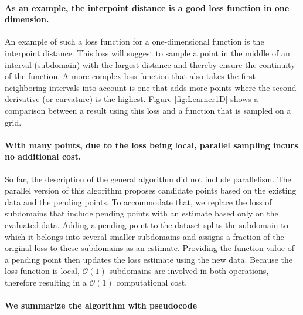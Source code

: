 \hypertarget{as-an-example-the-interpoint-distance-is-a-good-loss-function-in-one-dimension.}{%
\paragraph{As an example, the interpoint distance is a good loss function in one dimension.}\label{as-an-example-the-interpoint-distance-is-a-good-loss-function-in-one-dimension.}}

An example of such a loss function for a one-dimensional function is the interpoint distance.
This loss will suggest to sample a point in the middle of an interval (subdomain) with the largest distance and thereby ensure the continuity of the function.
A more complex loss function that also takes the first neighboring intervals into account is one that adds more points where the second derivative (or curvature) is the highest.
Figure \ref{fig:Learner1D} shows a comparison between a result using this loss and a function that is sampled on a grid.

\hypertarget{with-many-points-due-to-the-loss-being-local-parallel-sampling-incurs-no-additional-cost.}{%
\paragraph{With many points, due to the loss being local, parallel sampling incurs no additional cost.}\label{with-many-points-due-to-the-loss-being-local-parallel-sampling-incurs-no-additional-cost.}}

So far, the description of the general algorithm did not include parallelism.
The parallel version of this algorithm proposes candidate points based on the existing data and the pending points.
To accommodate that, we replace the loss of subdomains that include pending points with an estimate based only on the evaluated data.
Adding a pending point to the dataset splits the subdomain to which it belongs into several smaller subdomains and assigns a fraction of the original loss to these subdomains as an estimate.
Providing the function value of a pending point then updates the loss estimate using the new data.
Because the loss function is local, $\mathcal{O}(1)$ subdomains are involved in both operations, therefore resulting in a $\mathcal{O}(1)$ computational cost.

\hypertarget{we-summarize-the-algorithm-with-pseudocode}{%
\paragraph{We summarize the algorithm with pseudocode}\label{we-summarize-the-algorithm-with-pseudocode}}

